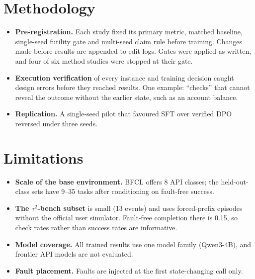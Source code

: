 \documentclass[11pt]{article}
\newcommand{\tautwo}{$\tau^2$-bench}
\begin{document}
\section{Methodology}\label{sec:method}
\begin{itemize}
\item \textbf{Pre-registration.} Each study fixed its primary metric, matched baseline, single-seed futility gate and multi-seed claim rule before training. Changes made before results are appended to edit logs. Gates were applied as written, and four of six method studies were stopped at their gate.
\item \textbf{Execution verification} of every instance and training decision caught design errors before they reached results. One example: ``checks'' that cannot reveal the outcome without the earlier state, such as an account balance.
\item \textbf{Replication.} A single-seed pilot that favoured SFT over verified DPO reversed under three seeds.
\end{itemize}

\section{Limitations}
\begin{itemize}
\item \textbf{Scale of the base environment.} BFCL offers 8 API classes; the held-out-class sets have 9--35 tasks after conditioning on fault-free success.
\item \textbf{The \tautwo{} subset} is small (13 events) and uses forced-prefix episodes without the official user simulator. Fault-free completion there is 0.15, so check rates rather than success rates are informative.
\item \textbf{Model coverage.} All trained results use one model family (Qwen3-4B), and frontier API models are not evaluated.
\item \textbf{Fault placement.} Faults are injected at the first state-changing call only.
\end{itemize}
\end{document}
